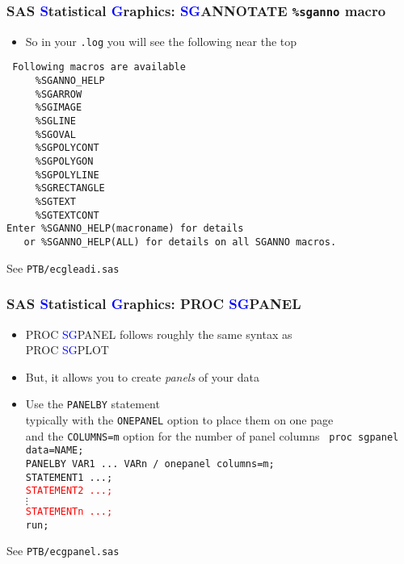 \documentclass[11pt,pdftex,dvipsnames,usenames,helvetica]{beamer}
\begin{document}
\begin{frame}[fragile]
\frametitle{SAS \textcolor{blue}{S}tatistical \textcolor{blue}{G}raphics:
\textcolor{blue}{SG}ANNOTATE {\tt \%sganno} macro }
\begin{itemize}
\item So in your {\tt .log} you will see the following near the top
\end{itemize}
\begin{verbatim}
 Following macros are available 
     %SGANNO_HELP 
     %SGARROW 
     %SGIMAGE 
     %SGLINE 
     %SGOVAL 
     %SGPOLYCONT 
     %SGPOLYGON 
     %SGPOLYLINE 
     %SGRECTANGLE 
     %SGTEXT 
     %SGTEXTCONT 
Enter %SGANNO_HELP(macroname) for details 
   or %SGANNO_HELP(ALL) for details on all SGANNO macros.
\end{verbatim}
See {\tt PTB/ecgleadi.sas}
\end{frame}


\begin{frame}[fragile]
\frametitle{SAS \textcolor{blue}{S}tatistical \textcolor{blue}{G}raphics:
PROC \textcolor{blue}{SG}PANEL}
\begin{itemize}
\item PROC \textcolor{blue}{SG}PANEL follows roughly the same syntax
as\\ PROC \textcolor{blue}{SG}PLOT
\item But, it allows you to create {\it panels} of your data
\item Use the {\tt PANELBY} statement\\
typically with the {\tt ONEPANEL} option to place
them on one page \\
and the {\tt COLUMNS=m} option for the number of panel columns
{\tt 
proc sgpanel data=NAME;\\
PANELBY VAR1 ...\ VARn / onepanel columns=m;\\ 
STATEMENT1 ...;\\
\textcolor{red}{STATEMENT2 ...;}\\
$\vdots$\\
\textcolor{red}{STATEMENTn ...;}\\
run;}\\
\end{itemize}
See {\tt PTB/ecgpanel.sas}
\end{frame}
\end{document}
